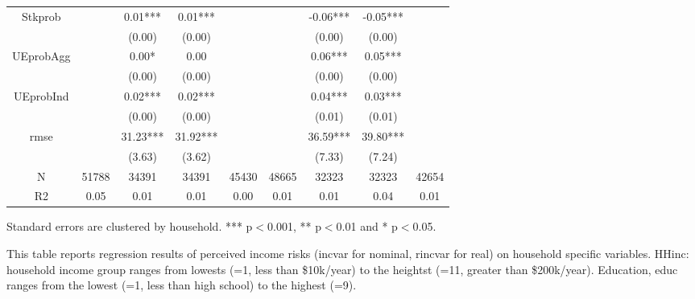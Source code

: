 \begin{table}[p]
\begin{adjustbox}{width=\textwidth}
\begin{threeparttable}
\begin{tabular}{ccccccccc}
Stkprob          &          &    0.01*** &    0.01*** &             &           &   -0.06*** &    -0.05*** &              \\
                 &          &     (0.00) &     (0.00) &             &           &     (0.00) &      (0.00) &              \\
UEprobAgg        &          &      0.00* &       0.00 &             &           &    0.06*** &     0.05*** &              \\
                 &          &     (0.00) &     (0.00) &             &           &     (0.00) &      (0.00) &              \\
UEprobInd        &          &    0.02*** &    0.02*** &             &           &    0.04*** &     0.03*** &              \\
                 &          &     (0.00) &     (0.00) &             &           &     (0.01) &      (0.01) &              \\
rmse             &          &   31.23*** &   31.92*** &             &           &   36.59*** &    39.80*** &              \\
                 &          &     (3.63) &     (3.62) &             &           &     (7.33) &      (7.24) &              \\
N                &    51788 &      34391 &      34391 &       45430 &     48665 &      32323 &       32323 &        42654 \\
R2               &     0.05 &       0.01 &       0.01 &        0.00 &      0.01 &       0.01 &        0.04 &         0.01 \\
\bottomrule
\end{tabular}
\begin{tablenotes}\item Standard errors are clustered by household. *** p$<$0.001, ** p$<$0.01 and * p$<$0.05. 
\item This table reports regression results of perceived income risks (incvar for nominal, rincvar for real) on household specific variables. HHinc: household income group ranges from lowests (=1, less than \$10k/year) to the heightst (=11, greater than \$200k/year). Education, educ ranges from the lowest (=1, less than high school) to the highest (=9).
\end{tablenotes}
\end{threeparttable}
\end{adjustbox}
\end{table}